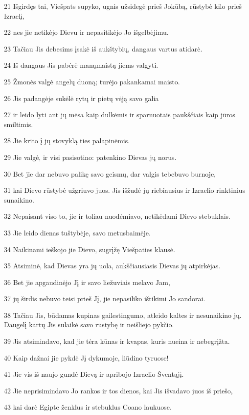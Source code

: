 \par 21 Išgirdęs tai, Viešpats supyko, ugnis užsidegė prieš Jokūbą, rūstybė kilo prieš Izraelį, 
\par 22 nes jie netikėjo Dievu ir nepasitikėjo Jo išgelbėjimu. 
\par 23 Tačiau Jis debesims įsakė iš aukštybių, dangaus vartus atidarė. 
\par 24 Iš dangaus Jis pabėrė maną­maistą jiems valgyti. 
\par 25 Žmonės valgė angelų duoną; turėjo pakankamai maisto. 
\par 26 Jis padangėje sukėlė rytų ir pietų vėją savo galia 
\par 27 ir leido lyti ant jų mėsa kaip dulkėmis ir sparnuotais paukščiais kaip jūros smiltimis. 
\par 28 Jie krito į jų stovyklą ties palapinėmis. 
\par 29 Jie valgė, ir visi pasisotino: patenkino Dievas jų norus. 
\par 30 Bet jie dar nebuvo palikę savo geismų, dar valgis tebebuvo burnoje, 
\par 31 kai Dievo rūstybė užgriuvo juos. Jis išžudė jų riebiausius ir Izraelio rinktinius sunaikino. 
\par 32 Nepaisant viso to, jie ir toliau nuodėmiavo, netikėdami Dievo stebuklais. 
\par 33 Jie leido dienas tuštybėje, savo metus­baimėje. 
\par 34 Naikinami ieškojo jie Dievo, sugrįžę Viešpaties klausė. 
\par 35 Atsiminė, kad Dievas yra jų uola, aukščiausiasis Dievas jų atpirkėjas. 
\par 36 Bet jie apgaudinėjo Jį ir savo liežuviais melavo Jam, 
\par 37 jų širdis nebuvo teisi prieš Jį, jie nepasiliko ištikimi Jo sandorai. 
\par 38 Tačiau Jis, būdamas kupinas gailestingumo, atleido kaltes ir nesunaikino jų. Daugelį kartų Jis sulaikė savo rūstybę ir neišliejo pykčio. 
\par 39 Jis atsimindavo, kad jie tėra kūnas ir kvapas, kuris nueina ir nebegrįžta. 
\par 40 Kaip dažnai jie pykdė Jį dykumoje, liūdino tyruose! 
\par 41 Jie vis iš naujo gundė Dievą ir apribojo Izraelio Šventąjį. 
\par 42 Jie neprisimindavo Jo rankos ir tos dienos, kai Jis išvadavo juos iš priešo, 
\par 43 kai darė Egipte ženklus ir stebuklus Coano laukuose. 
